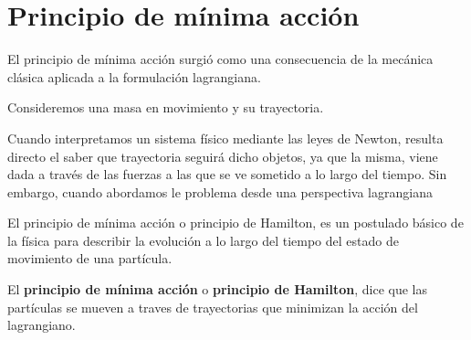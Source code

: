 \section{Principio de mínima acción}\label{sec:principio-de-minima-accion}

El principio de mínima acción surgió como una consecuencia de la mecánica clásica aplicada a la formulación lagrangiana.

Consideremos una masa en movimiento y su trayectoria.

Cuando interpretamos un sistema físico mediante las leyes de Newton, resulta directo el saber que trayectoria seguirá dicho objetos, ya que la misma, viene dada a través de las fuerzas a las que se ve sometido a lo largo del tiempo. Sin embargo, cuando abordamos le problema desde una perspectiva lagrangiana

El principio de mínima acción o principio de Hamilton, es un postulado básico de la física para describir la evolución a lo largo del tiempo del estado de movimiento de una partícula.

El \textbf{principio de mínima acción} o \textbf{principio de Hamilton}, dice que las partículas se mueven a traves de trayectorias que minimizan la acción del lagrangiano.
